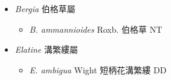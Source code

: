 
  \begin{itemize}
 \item[] \textit{Bergia} 伯格草屬
                                
  \begin{itemize}
        \item[] \textit{B. ammannioides} Roxb.  伯格草   NT
  \end{itemize}
 \item[] \textit{Elatine} 溝繁縷屬
                                
  \begin{itemize}
        \item[] \textit{E. ambigua} Wight  短柄花溝繁縷   DD
  \end{itemize}
  \end{itemize}
